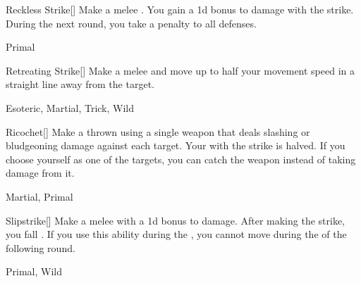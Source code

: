 \lowercase{\hypertarget{maneuver:Reckless Strike}{}}\label{maneuver:Reckless Strike}
\hypertarget{maneuver:Reckless Strike}{}
\begin{freeability}[Rank 2]{Reckless Strike}[]
Make a melee .
You gain a \plus1d bonus to damage with the strike.
During the next round, you take a  penalty to all defenses.


 Primal
\end{freeability}
\vspace{0.25em}



\lowercase{\hypertarget{maneuver:Retreating Strike}{}}\label{maneuver:Retreating Strike}
\hypertarget{maneuver:Retreating Strike}{}
\begin{freeability}[Rank 2]{Retreating Strike}[]
Make a melee  and move up to half your movement speed in a straight line away from the target.


 Esoteric, Martial, Trick, Wild
\end{freeability}
\vspace{0.25em}



\lowercase{\hypertarget{maneuver:Ricochet}{}}\label{maneuver:Ricochet}
\hypertarget{maneuver:Ricochet}{}
\begin{freeability}[Rank 2]{Ricochet}[]
Make a thrown  using a single weapon that deals slashing or bludgeoning damage against each target.
Your  with the strike is halved.
If you choose yourself as one of the targets, you can catch the weapon instead of taking damage from it.


 Martial, Primal
\end{freeability}
\vspace{0.25em}



\lowercase{\hypertarget{maneuver:Slipstrike}{}}\label{maneuver:Slipstrike}
\hypertarget{maneuver:Slipstrike}{}
\begin{freeability}[Rank 2]{Slipstrike}[]
Make a melee  with a \plus1d bonus to damage.
After making the strike, you fall .
If you use this ability during the , you cannot move during the  of the following round.


 Primal, Wild
\end{freeability}
\vspace{0.25em}



